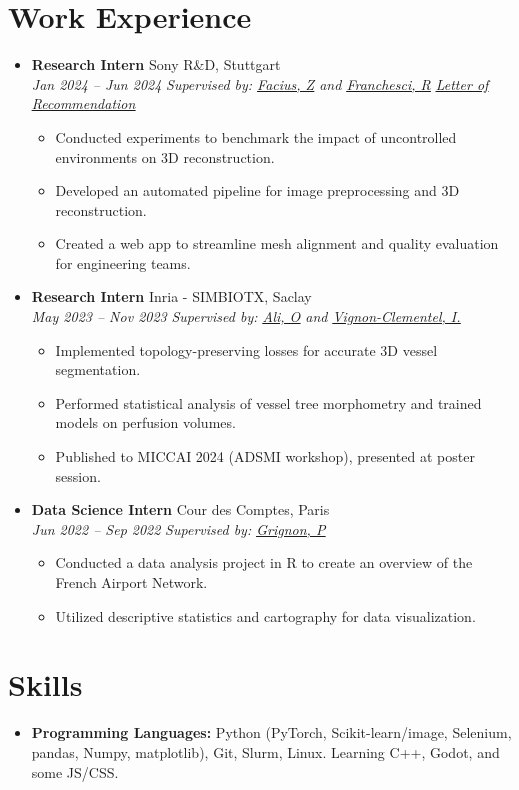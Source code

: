 \documentclass[letterpaper,11pt,twocolumn]{article}
\newcommand{\resumeItem}[1]{\item \small{#1}}
\newcommand{\resumeSubheading}[4]{
  \vspace{-2pt}\item \textbf{#1} \hfill #2 \\
  \textit{\small #3} \hfill \textit{\small #4} 
  \vspace{-7pt}
}
\newcommand{\resumeItemListStart}{\begin{itemize}[leftmargin=*]}
\newcommand{\resumeItemListEnd}{\end{itemize}\vspace{-5pt}}
\begin{document}
\section{Work Experience}
\begin{itemize}[leftmargin=*]
  \resumeSubheading
    {Research Intern}{Sony R\&D, Stuttgart}{Jan 2024 -- Jun 2024}{\textit{Supervised by: \href{https://de.linkedin.com/in/zoltan-facius-6b424112}{\underline{Facius, Z}} and \href{https://de.linkedin.com/in/roberto-franceschi}{\underline{Franchesci, R}}} \vspace{5pt} \href{https://machtayassine.github.io/resume/Sony_LoR.pdf}{\underline{\textit{Letter of Recommendation}}}}
    
  \resumeItemListStart
    \resumeItem{Conducted experiments to benchmark the impact of uncontrolled environments on 3D reconstruction.}
    \resumeItem{Developed an automated pipeline for image preprocessing and 3D reconstruction.}
    \resumeItem{Created a web app to streamline mesh alignment and quality evaluation for engineering teams.}
  \resumeItemListEnd

  \resumeSubheading
    {Research Intern}{Inria - SIMBIOTX, Saclay}{May 2023 -- Nov 2023}{\textit{Supervised by: \href{https://scholar.google.com/citations?user=tKRo0ewAAAAJ&hl=en}{\underline{Ali, O}} and \href{https://team.inria.fr/simbiotx/team-members/irene-vignon-clementel/}{\underline{Vignon-Clementel, I.}}}}
    
  \resumeItemListStart
    \resumeItem{Implemented topology-preserving losses for accurate 3D vessel segmentation.}
    \resumeItem{Performed statistical analysis of vessel tree morphometry and trained models on perfusion volumes.}
    \resumeItem{Published to MICCAI 2024 (ADSMI workshop), presented at poster session.}
  \resumeItemListEnd

  \resumeSubheading
    {Data Science Intern}{Cour des Comptes, Paris}{Jun 2022 -- Sep 2022}{\textit{Supervised by: \href{https://fr.linkedin.com/in/paulgrignon}{\underline{Grignon, P}}}}
    
  \resumeItemListStart
    \resumeItem{Conducted a data analysis project in R to create an overview of the French Airport Network.}
    \resumeItem{Utilized descriptive statistics and cartography for data visualization.}
  \resumeItemListEnd
\end{itemize}

\section{Skills}
\begin{itemize}[leftmargin=*]
  \item \textbf{Programming Languages:} Python (PyTorch, Scikit-learn/image, Selenium, pandas, Numpy, matplotlib), Git, Slurm, Linux. Learning C++, Godot, and some JS/CSS.
\end{itemize}
\end{document}
